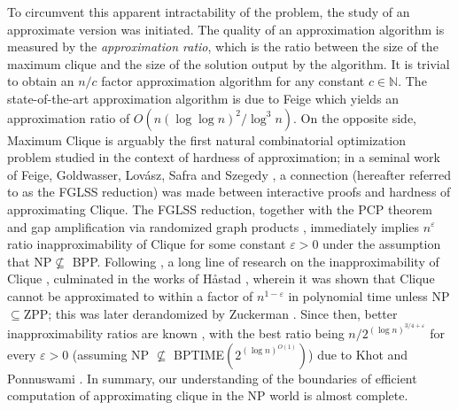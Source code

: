 \documentclass[11pt]{article}
\begin{document}
To circumvent this apparent intractability of the problem, the study of an approximate version was initiated. The quality of an approximation algorithm is measured by the \emph{approximation ratio}, which is the ratio between  the size of the maximum clique and the size of the solution output by the algorithm. It is trivial to obtain an $n/c$ factor approximation algorithm for any constant $c\in\mathbb{N}$. The state-of-the-art approximation algorithm is due to Feige \cite{F04} which yields an approximation ratio of $O(n(\log\log n)^2/\log^3 n)$. 
On the opposite side, Maximum Clique is arguably the first natural combinatorial optimization problem studied in the context of hardness of approximation; in a seminal work of Feige, Goldwasser, Lov\'asz, Safra and Szegedy \cite{FGLSS96}, a connection (hereafter referred to as the FGLSS reduction) was made between interactive proofs and hardness of approximating Clique. The FGLSS reduction, together with the PCP theorem \cite{AS98,ALMSS98,D07} and gap amplification via randomized graph products \cite{BS92}, immediately implies $n^\varepsilon$ ratio inapproximability of Clique for some constant $\varepsilon>0$ under the assumption that NP$\not\subseteq$ BPP. Following \cite{FGLSS96},   a long line of research on the inapproximability of Clique \cite{BGLR93,FK00,BGS98,BS94},   culminated in the works of H\r{a}stad  \cite{H96a,H96b}, wherein it was shown that Clique cannot be approximated to within a factor of $n^{1-\varepsilon}$ in polynomial time unless NP$\subseteq$ZPP; this was later derandomized by Zuckerman  \cite{Z07}. Since then, better inapproximability ratios are known \cite{EH00,K01,KP06}, with the best ratio being $n/2^{(\log n)^{3/4+\varepsilon}}$ for every $\varepsilon> 0$ (assuming NP $\nsubseteq$ BPTIME$(2^{(\log n)^{O(1)}})$) due to Khot and Ponnuswami \cite{KP06}. In summary, our understanding of the boundaries of efficient computation of approximating clique in the NP world is almost complete. 
\end{document}

